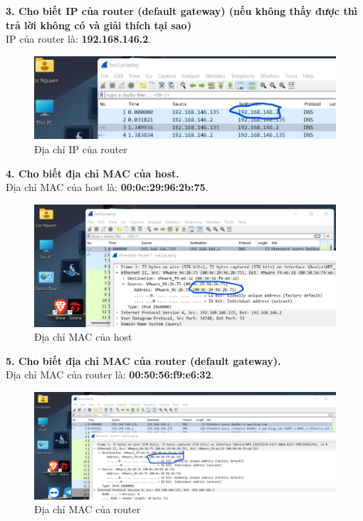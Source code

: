 \textbf{3. Cho biết IP của router (default gateway) (nếu không thấy được thì trả lời không có và giải thích tại sao)}\\
IP của router là: \textbf{192.168.146.2}.
\begin{figure}[H]
\begin{center}
\includegraphics[scale=1]{../figures/p2/p2_routerip}
\end{center}
\caption{Địa chỉ IP của router}
\end{figure}

\textbf{4. Cho biết địa chỉ MAC của host.}\\
Địa chỉ MAC của host là: \textbf{00:0c:29:96:2b:75}.
\begin{figure}[H]
\begin{center}
\includegraphics[scale=1]{../figures/p2/p2_hostmac}
\end{center}
\caption{Địa chỉ MAC của host}
\end{figure}

\textbf{5.	Cho biết địa chỉ MAC của router (default gateway).}\\
Địa chỉ MAC của router là: \textbf{00:50:56:f9:e6:32}.
\begin{figure}[H]
\begin{center}
\includegraphics[scale=1]{../figures/p2/p2_routermac}
\end{center}
\caption{Địa chỉ MAC của router}
\end{figure}

